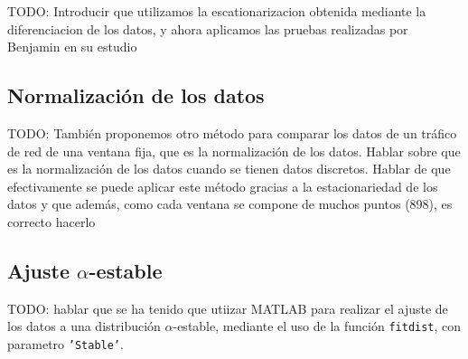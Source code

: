 TODO: Introducir que utilizamos la escationarizacion obtenida mediante la diferenciacion de los datos, y ahora aplicamos las pruebas realizadas por Benjamin en su estudio

\subsection{Normalización de los datos}

TODO: También proponemos otro método para comparar los datos de un tráfico de red de una ventana fija, que es la normalización de los datos. 
Hablar sobre que es la normalización de los datos cuando se tienen datos discretos. Hablar de que efectivamente se puede aplicar este método gracias a la estacionariedad de los datos
y que además, como cada ventana se compone de muchos puntos (898), es correcto hacerlo

\subsection{Ajuste $\alpha$-estable}

TODO: hablar que se ha tenido que utiizar MATLAB para realizar el ajuste de los datos a una distribución $\alpha$-estable, mediante el uso de la función \texttt{fitdist}, con parametro \texttt{'Stable'}.

